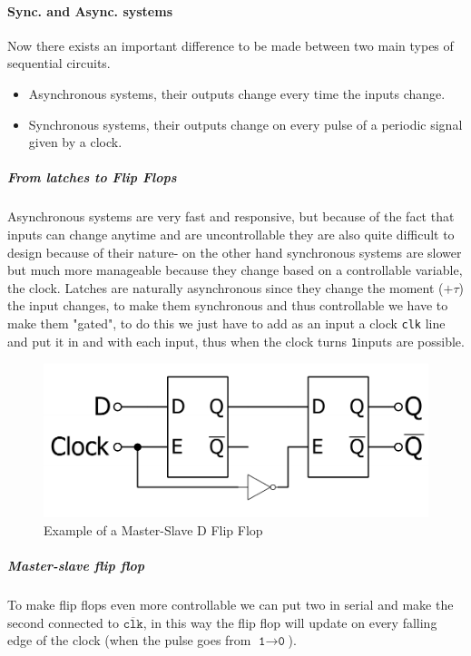 \documentclass{scrartcl}
\newcommand{\zero}{\texttt{0}}
\newcommand{\one}{\texttt{1}}
\begin{document}
    \paragraph{Sync. and Async. systems} Now there exists an important difference to be made between two main types of sequential circuits.
    \begin{itemize}
        \item Asynchronous systems, their outputs change every time the inputs change.
        \item Synchronous systems, their outputs change on every pulse of a periodic signal given by a clock.
    \end{itemize}
    \subparagraph{From latches to Flip Flops}
    Asynchronous systems are very fast and responsive, but because of the fact that inputs can change anytime and are uncontrollable they are also quite difficult to design because of their nature- on the other hand synchronous systems are slower but much more manageable because they change based on a controllable variable, the clock.
    Latches are naturally asynchronous since they change the moment ($+ \tau$) the input changes, to make them synchronous and thus controllable we have to make them "gated", to do this we just have to add as an input a clock \texttt{clk} line and put it in and with each input, thus when the clock turns \one inputs are possible.
    \begin{figure}
        \begin{center}
            \includegraphics[scale=0.5]{D_FF.pdf}
        \end{center}
        \caption{Example of a Master-Slave D Flip Flop}
    \end{figure}
    \subparagraph{Master-slave flip flop} To make flip flops even more controllable we can put two in serial and make the second connected to $\overline{\texttt{clk}}$, in this way the flip flop will update on every falling edge of the clock (when the pulse goes from $\one\to\zero$).
\end{document}
